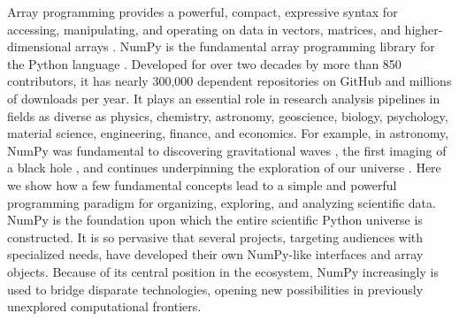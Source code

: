 




Array programming provides a powerful, compact, expressive syntax for accessing,
manipulating, and operating on data in vectors, matrices, and
higher-dimensional arrays \cite{iverson1980notation}.
NumPy is the fundamental array programming library for the Python language
\cite{dubois2007guest,oliphant2007python,millman2011python,perez2011python}.
Developed for over two decades by more than 850 contributors, 
it has nearly 300,000 dependent repositories on GitHub and millions of
downloads per year.
It plays an essential role in research analysis pipelines in fields as
diverse as physics, chemistry, astronomy, geoscience, biology, psychology,
material science, engineering, finance, and economics.
For example, in astronomy, NumPy was fundamental to discovering gravitational
waves \cite{abbott2016observation}, the first imaging of a black hole \cite{eht-imaging}, and
continues underpinning the exploration of our
universe \cite{jenness2018lsst}.
Here we show how a few fundamental concepts lead to a simple and
powerful programming paradigm for organizing, exploring, and analyzing
scientific data.
NumPy is the foundation upon which the entire scientific Python
universe is constructed. It is so pervasive that several projects,
targeting audiences with specialized needs, have developed their own
NumPy-like interfaces and array objects.  Because of its central position in the
ecosystem, NumPy increasingly is used to bridge disparate
technologies, opening new possibilities in previously unexplored computational frontiers.

